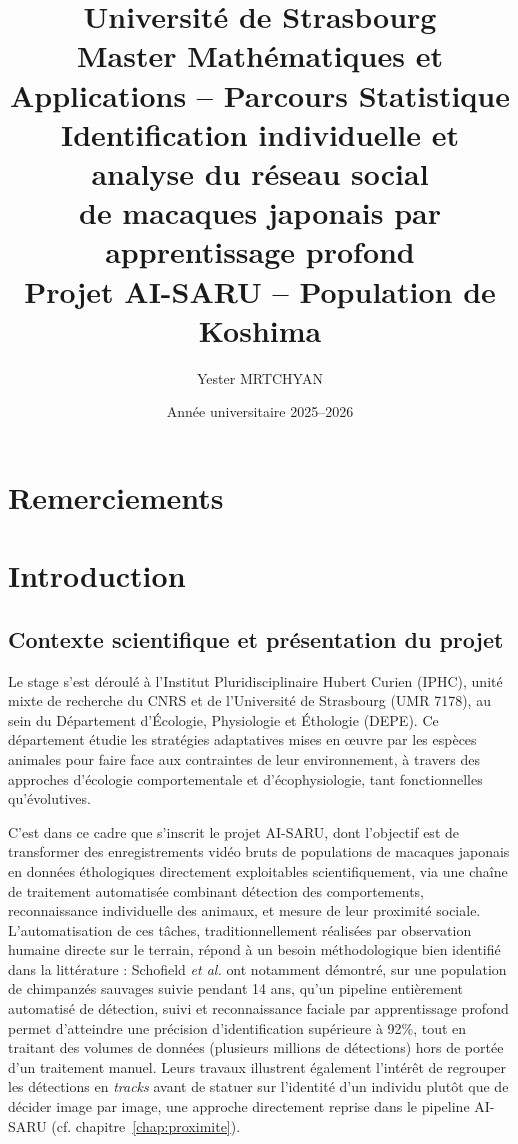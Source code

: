 \documentclass[11pt,a4paper]{report}
\title{
    \Large Université de Strasbourg \\
    \large Master Mathématiques et Applications -- Parcours Statistique \\
    \vspace{1cm}
    \Huge \textbf{Identification individuelle et analyse du réseau social \\ de macaques japonais par apprentissage profond} \\
    \vspace{0.3cm}
    \large Projet AI-SARU -- Population de Koshima
}
\author{Yester MRTCHYAN}
\date{Année universitaire 2025--2026}
\begin{document}
\maketitle
\thispagestyle{empty}

\chapter*{Remerciements}
\thispagestyle{empty}

\newpage

\tableofcontents
\thispagestyle{empty}

\newpage


\chapter*{Introduction}

\section*{Contexte scientifique et présentation du projet}

Le stage s'est déroulé à l'Institut Pluridisciplinaire Hubert Curien (IPHC), unité
mixte de recherche du CNRS et de l'Université de Strasbourg (UMR 7178), au sein du
Département d'Écologie, Physiologie et Éthologie (DEPE). Ce département étudie les
stratégies adaptatives mises en \oe uvre par les espèces animales pour faire face aux
contraintes de leur environnement, à travers des approches d'écologie comportementale
et d'écophysiologie, tant fonctionnelles qu'évolutives.

C'est dans ce cadre que s'inscrit le projet AI-SARU, dont l'objectif est de
transformer des enregistrements vidéo bruts de populations de macaques japonais en
données éthologiques directement exploitables scientifiquement, via une chaîne de
traitement automatisée combinant détection des comportements, reconnaissance
individuelle des animaux, et mesure de leur proximité sociale. L'automatisation de
ces tâches, traditionnellement réalisées par observation humaine directe sur le
terrain, répond à un besoin méthodologique bien identifié dans la littérature :
Schofield \emph{et al.} \citep{schofield2019} ont notamment démontré, sur une
population de chimpanzés sauvages suivie pendant 14 ans, qu'un pipeline entièrement
automatisé de détection, suivi et reconnaissance faciale par apprentissage profond
permet d'atteindre une précision d'identification supérieure à 92\%, tout en
traitant des volumes de données (plusieurs millions de détections) hors de portée
d'un traitement manuel. Leurs travaux illustrent également l'intérêt de regrouper
les détections en \emph{tracks} avant de statuer sur l'identité d'un individu plutôt
que de décider image par image, une approche directement reprise dans le pipeline
AI-SARU (cf. chapitre~\ref{chap:proximite}).
\end{document}
